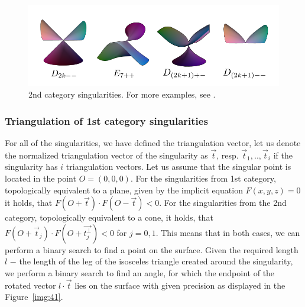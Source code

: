 \begin{itemize}
\begin{itemize}
    \end{itemize}
    \begin{figure}
        \centerline{\includegraphics[scale=0.5]{images/img43}}
        \caption[2nd category singularities]
        {2nd category singularities. For more examples, see \cite{morris2003client}.}
        \label{img:43}
    \end{figure}
\end{itemize}

\subsubsection*{Triangulation of 1st category singularities}
For all of the singularities, we have defined the triangulation vector,
let us denote the normalized triangulation vector of the singularity 
as $\vec{t}$, resp. $\vec{t}_1, .., \vec{t}_i$ if the 
singularity has $i$ triangulation vectors.
Let us assume that the singular point is located in the point $O = (0, 0, 0).$
For the singularities from 1st category, 
topologically equivalent to a plane, given by the implicit
equation $F(x, y, z) = 0$ it holds, that $F(O+\vec{t}) \cdot F(O-\vec{t})<0$.
For the singularities from the 2nd category, topologically equivalent to a cone,
it holds, that $F(O+\vec{t}_j) \cdot F(O+\vec{t_j^\bot}) <0$ for $j = 0, 1$.
This means that in both cases, we can perform a binary search to find a point on 
the surface.
Given the required length $l$ $-$ the length of the leg of the isosceles triangle 
created around the singularity, we perform a binary search to find
an angle, for which the endpoint of the rotated vector $l \cdot \vec{t}$ lies on 
the surface with given precision as displayed in the Figure~\ref{img:41}.

